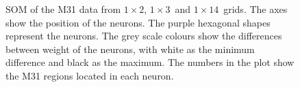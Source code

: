        \begin{figure}
            \hfill
             \hfill
            \caption{SOM of the M31 data from $1\times2$, $1\times3$~and $1\times14$~grids. The axes show the position of the neurons. The purple hexagonal shapes represent the neurons. The grey scale colours show the differences between weight of the neurons, with white as the minimum difference and black as the maximum. The numbers in the plot show the M31 regions located in each neuron.}
            \label{fig: M31_nets_1d}
        \end{figure}
        
